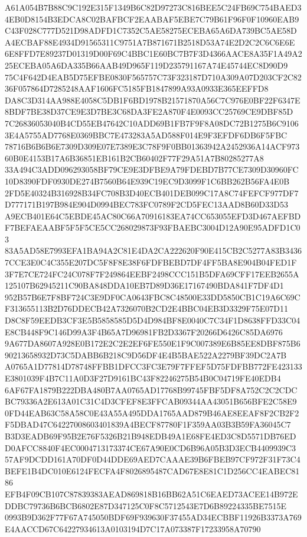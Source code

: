 \documentclass[UTF8,fontset=fandol,zihao=-4,a4paper]{ctexart}
\begin{document}
{{A61A054B7B88C9C192E315F1349B6C82D97273C816BEE5C24FB69C754BAED34EB0D8154B3EDCA8C02BAFBCF2EAABAF5EBE7C79B61F96F0F10960EAB9
C43F028C777D521D98ADFD1C7352C5AE58275ECEBA65A6DA739BC5AE58DA4ECBAF88E4934D91565311C9751A7B871671B2518D53A74E2D2C2C6C6E6E
6E8FFD7E89237D01319D00F69C4BBC1E60BC7B7F3D4366AACE8A35F1A49A225ECEBA05A6DA335B66AAB49D965F119D235791167A74E45744EC8D90D9
75C4F642D4EAB5D75EFBE0830F565757C73F323187D710A309A07D203CF2C8236F057864D7285248AAF1606FC5185FB1847899A93A0933E365EEFFD8
DA8C3D314AA988E4058C5DB1F6BD1978B21571870A56C7C976E0BF22F6347E8BDF7BE38D37CE9E3D7BE3C68DA3FE2A870F4E0093CC25769CE9DBF85D
7C26836053040B4CD55EB47642C10ADD69B1FB7F9F8A08DC72B1275B6C91063E4A5755AD7768E0369BBC7E473283A5AD588F014E9F3EFDF6DB6F5FBC
78716B6B6B6E7309D309E07E7389E3C78F9F0BB01363942A2452936A14ACF97360B0E4153B17A6B36851EB161B2CB60402F77F29A51A7B80285277A8
33A494C3ADD096293058BF79CE9E3DFBE9A79FDEBD7B77CE7309D30960FC10D8390FDF0930DE274B7560B64E939C19EC9D3099F1C6BB262B56FA4E0B
2FD5E40324B316928B34FC708B3D40ECB401DEB099C17A8C74FEFCF977DF7D777171B197B984E904D0994BEC783FC0789F2CD5FEC13AAD8B60D33D53
A9ECB401E64C5EBDE45AC80C66A70916183EA74CC653055EFD3D467AEFBDF7BEFAEAABF5F5F5CE5CC268029873F93FBAEBC3004D12A90E95ADFD1C03
83A5AD58E7993EFA1BA94A2C81E4DA2CA222620F90E415CB2C5277A83B34367CCE3E0C4C355E207DC5F8F8E38F6FDFBEBD7DF4FF5BA8E904B04FED1F
3F7E7CE724FC24C078F7F249864EEBF2498CCC151B5DFA69CFF17EEB2655A125107B62945211C90BA848DDA10EB7D89D36E17167490BDA841F7DF4D1
952B57B6E7F8BF724C3E9DF0CA0643FBC8C48500E33DD5850CB1C19A6C69CF313655113B2D76DDECB42A7326070B2CD2E4BBC04EB3D3329F75E07D11
D8C8F59EEDB3CF3E5B5858585D5D4D984BF8E0040C7C34F1D8638FFD33C04E8CB448F9C146D99A3F4B65A7D96981FB2D3367F20266D6426C85DA6976
9A677DA8607A928E0B172E2C2E2EF6FE550E1F9C007389E6B85EE8DBF875B690213658932D73C5DABB6B218C9D56DF4E4B5BAE522A2279BF39DC2A7B
A0765A1D77814D78748FFBB1DFCC3FC3E79F7FFEF5D75FDFBB772FE423133E3801039F4B7C11A0D3F27D9161BC43F82246275B54B0C04719FE40EDB4
6AF67FA1879B222DBA480B7AA0765AD17768B99745FBF5DF8A752C2C2CDCBC79336A2E613A01C31C4D3CFEF8E3FFCAB09344AA43051B656BFE2C58E9
0FD44EAB63C58A58C0E43A55A495DDA1765AAD879B46AE8EEAF8F2CB2F2F5DBAD47C64227008603401839A4BECF87780F1F359AA03B3B59FA36045C7
B3D3EADB69F95B2E76F5326B21B948EDB49A1E68FE4ED3C8D5571DB76EDD0AFCC8840F4EC0004713173374CE67A90E0CD6B96A05B3D3ECB4409939C3
57AF9DCDD161A70DF0D44DDE69AED7CAAAE39B6FBEB97CF972F31F73C4BEFE1B4DC010E6124FECFA4F8026895487CAD67E8E81C1D256CC4EABEC8186
EFB4F09CB107C87839383AEAD869818B16BB62A51C6EAED73ACEE14B972EDDBC79736B6BCB6802E87D347125C0F8C5712543E7D6B89224335BE7515E
0993B9D362F77F67A745050BDF69F939630F37455AD34ECBBF11926B3373A769E4AACCD67C64227934613A0103194D7C17A073387F17233958A70790
}}
\end{document}
